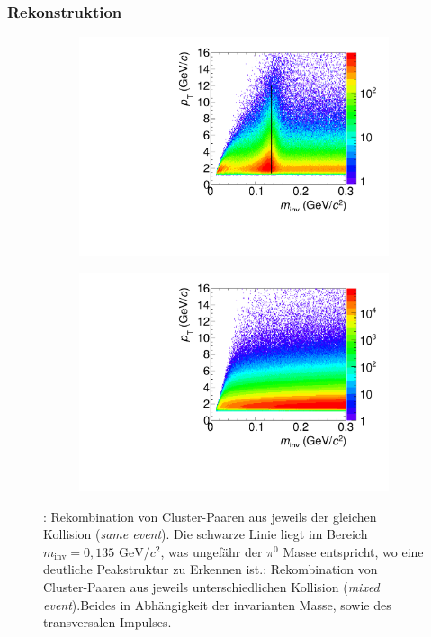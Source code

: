 \documentclass[]{article}
\begin{document}
	
	\subsubsection{Rekonstruktion}
	\begin{figure}[tbp]
		\centering
		\begin{subfigure}{.5\textwidth}
			\centering
			\includegraphics[width=.95\linewidth]{hInvMass_pT_Signal.pdf}
			\caption{}
			\label{figInvMassPt_a}
		\end{subfigure}%
		\begin{subfigure}{.5\textwidth}
			\centering
			\includegraphics[width=.95\linewidth]{hInvMass_pT_Bkg.pdf}
			\caption{}
			\label{figInvMassPt_b}
		\end{subfigure}
		\caption{: Rekombination von Cluster-Paaren aus jeweils der gleichen Kollision ({\it same event}). Die schwarze Linie liegt im Bereich $m_{\text{inv}}=0,135\text{ GeV/}c^{2}$, was ungef{\"a}hr der $\pi^{0}$ Masse entspricht, wo eine deutliche Peakstruktur zu Erkennen ist.: Rekombination von Cluster-Paaren aus jeweils unterschiedlichen Kollision ({\it mixed event}).\newline Beides in Abh{\"a}ngigkeit der invarianten Masse, sowie des transversalen Impulses.}
		\label{figInvMassPt}
	\end{figure}
\end{document}
